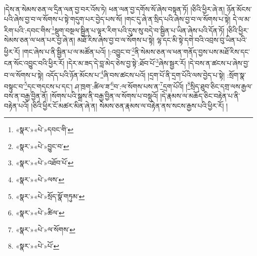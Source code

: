 །དེས་ན་སེམས་ཅན་ལ་དྲིན་ལན་བྱ་བར་འོས་ཏེ། ཕན་ལན་བྱ་དགོས་སོ་ཞེས་བསྟན་ཏོ། །ཅིའི་ཕྱིར་ཞེ་ན། ཉོན་མོངས་པའི་ཞེས་བྱ་བ་ལ་སོགས་པ་སྟེ་གདུག་པར་བྱེད་པས་སོ། །གང་དུ་ཞེ་ན་སྲིད་པའི་ཞེས་བྱ་བ་ལ་སོགས་པ་སྟེ། དེ་ལ་མ་རིག་པའི་:དབང་གིས་\footnote{«སྣར་»«པེ་»དབང་གི་}སྡུག་བསྔལ་སྦྱིན་པ་ལྟར་རིག་པའི་དུས་སུ་བདེ་བ་སྦྱིན་པ་ཡིན་ཞེས་པའི་དོན་ཏོ། །ཅིའི་ཕྱིར་སེམས་ཅན་ལ་ཕན་པར་བྱ་ཞེ་ན། མཐོ་རིས་ཞེས་བྱ་བ་ལ་སོགས་པ་སྟེ། ལྷ་དང་མི་སྟེ་དགེ་བའི་འབྲས་བུ་ཡིན་པའི་ཕྱིར་རོ། །གང་ཞེས་པ་ནི་སྦྱིན་པ་ལ་མཚོན་པའོ། །:འབྱུང་བ་\footnote{«སྣར་»«པེ་»བྱུང་བ་}ནི་སེམས་ཅན་ལ་ཕན་གནོད་བྱས་པས་མཐོ་རིས་དང་ངན་སོང་འབྱུང་བའི་ཕྱིར་རོ། །དེར་མ་ཟད་དེ་བླ་མེད་ཅེས་བྱ་སྟེ་:ཐོབ་པོ་\footnote{«སྣར་»«པེ་»འཐོབ་པོ་}ཞེས་སྦྱར་རོ། །དེ་བས་ན་ཚངས་པ་ཞེས་བྱ་བ་ལ་སོགས་པ་སྟེ། འདོད་པའི་ཉོན་མོངས་པ་\footnote{«སྣར་»«པེ་»ལས་}ཞི་བས་ཚངས་པའོ། །དྲག་པོ་ནི་དྲག་པོའི་ལས་བྱེད་པ་སྟེ། :སྲོག་སྣ་བསྟུང་བ་\footnote{«སྣར་»«པེ་»སྲོད་སྣོ་གཏུམ་}དང་གདངས་པ་དང་། ཤ་ཁྲག་:ཚིལ་ཟ་\footnote{«སྣར་»«པེ་»ཚིལ་}བ་:ལ་སོགས་པས་ན་\footnote{«སྣར་»«པེ་»ལ་སོགས་}དྲག་པོའོ། །\footnote{«སྣར་»«པེ་»པོ་}སྲིད་ཐུབ་ཅིང་དགྲ་ལས་རྒྱལ་བས་ན་བརྒྱ་བྱིན་ནོ། །སོགས་པའི་སྒྲས་ནི་བརྒྱ་བྱིན་ལ་སོགས་པ་བསྡུའོ། །དེ་རྣམས་ལ་མཆོད་ཅིང་བརྟེན་པ་ནི་བརྟེན་པའོ། །ཅིའི་ཕྱིར་ངོ་མཚར་མིན་ཞེ་ན། སེམས་ཅན་རྣམས་ལ་བརྟེན་ནས་སངས་རྒྱས་པའི་ཕྱིར་རོ། །
